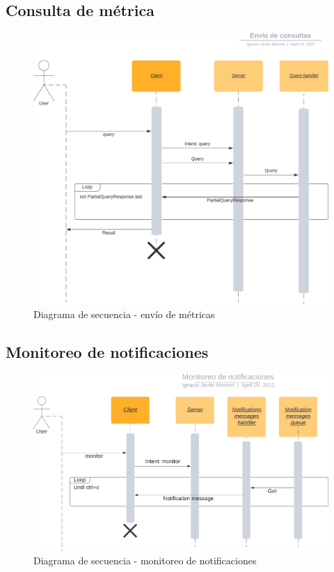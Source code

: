 \documentclass[titlepage,a4paper,oneside]{article}
\begin{document}
\subsection{Consulta de métrica}
\begin{figure}[H]
\centering
\includegraphics[width=\textwidth]{images/query.png}
\caption{Diagrama de secuencia \-- envío de métricas}
\end{figure}

\subsection{Monitoreo de notificaciones}
\begin{figure}[H]
\centering
\includegraphics[width=\textwidth]{images/notificaciones.png}
\caption{Diagrama de secuencia \-- monitoreo de notificaciones}
\end{figure}
\end{document}
